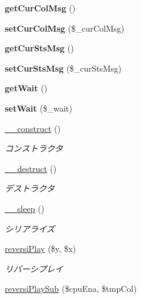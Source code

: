 \begin{DoxyCompactItemize}
{\bfseries get\+Cur\+Col\+Msg} ()
\item 
\mbox{\label{class_reversi_play_a1bf236c3884ff6e861b1d7aac307bb14}} 
{\bfseries set\+Cur\+Col\+Msg} (\$\+\_\+cur\+Col\+Msg)
\item 
\mbox{\label{class_reversi_play_a6986f6a44635bf7e6153c81b633023e7}} 
{\bfseries get\+Cur\+Sts\+Msg} ()
\item 
\mbox{\label{class_reversi_play_a7b5e5c74e95ae80d98ab164b33696d71}} 
{\bfseries set\+Cur\+Sts\+Msg} (\$\+\_\+cur\+Sts\+Msg)
\item 
\mbox{\label{class_reversi_play_a1d598b9d8ecb45452134acf8da25f537}} 
{\bfseries get\+Wait} ()
\item 
\mbox{\label{class_reversi_play_a1f7e985076ae8fa5a88c5938aa497066}} 
{\bfseries set\+Wait} (\$\+\_\+wait)
\item 
\hyperlink{class_reversi_play_a095c5d389db211932136b53f25f39685}{\+\_\+\+\_\+construct} ()
\begin{DoxyCompactList}\small\item\em コンストラクタ \end{DoxyCompactList}\item 
\hyperlink{class_reversi_play_a421831a265621325e1fdd19aace0c758}{\+\_\+\+\_\+destruct} ()
\begin{DoxyCompactList}\small\item\em デストラクタ \end{DoxyCompactList}\item 
\hyperlink{class_reversi_play_aaf11785905da71774e052912d784e3b4}{\+\_\+\+\_\+sleep} ()
\begin{DoxyCompactList}\small\item\em シリアライズ \end{DoxyCompactList}\item 
\hyperlink{class_reversi_play_a017d2d85f7c5c6917f528f30452d72d0}{reversi\+Play} (\$y, \$x)
\begin{DoxyCompactList}\small\item\em リバーシプレイ \end{DoxyCompactList}\item 
\hyperlink{class_reversi_play_a990fc6e45b7bdf2dab569f087f8b5a62}{reversi\+Play\+Sub} (\$cpu\+Ena, \$tmp\+Col)

\end{DoxyCompactItemize}
